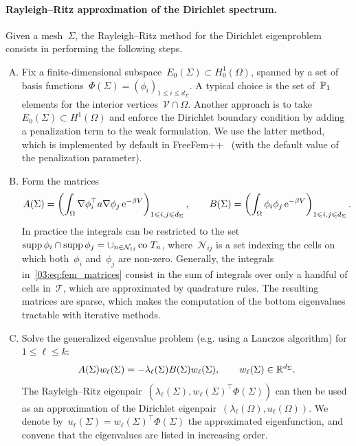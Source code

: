 \paragraph{Rayleigh--Ritz approximation of the Dirichlet spectrum.}
    Given a mesh~$\Sigma$, the Rayleigh--Ritz method for the Dirichlet eigenproblem consists in performing the following steps.
    \label{03:alg:rayleigh_ritz}
    \begin{enumerate}[A.]
        \item{Fix a finite-dimensional subspace~$E_{0}(\Sigma)\subset H_{0}^1(\Omega)$, spanned by a set of basis functions~$\Phi(\Sigma)=\left(\phi_i\right)_{1\leq i\leq d_{\Sigma}}$. A typical choice is the set of~$\P_1$ elements for the interior vertices~$\mathcal V\cap \Omega$.
        Another approach is to take~$E_0(\Sigma) \subset H^1(\Omega)$ and enforce the Dirichlet boundary condition by adding a penalization term to the weak formulation. We use the latter method, which is implemented by default in FreeFem++~\cite{freefem} (with the default value of the penalization parameter).
        }
        \item{Form the matrices
        \begin{equation}
            \label{03:eq:fem_matrices}
            A(\Sigma) = \left(\int_{\Omega} \nabla\phi_i^\top a \nabla\phi_j\,\e^{-\beta V}\right)_{1\leq i,j\leq d_{\Sigma}},\qquad B(\Sigma) = \left(\int_{\Omega} \phi_i\phi_j\,\e^{-\beta V}\right)_{1\leq i,j\leq d_{\Sigma}}.
        \end{equation}
        In practice the integrals can be restricted to the set~$\supp\,\phi_i \cap \supp\,\phi_j = \cup_{n\in \mathcal N_{ij}}\co\, T_n$, where~$\mathcal N_{ij}$ is a set indexing the cells on which both~$\phi_i$ and~$\phi_j$ are non-zero. Generally, the integrals in~\eqref{03:eq:fem_matrices} consist in the sum of integrals over only a handful of cells in~$\mathcal T$, which are approximated by quadrature rules.
        The resulting matrices are sparse, which makes the computation of the bottom eigenvalues tractable with iterative methods.
        }
        \item{Solve the generalized eigenvalue problem (e.g. using a Lanczos algorithm) for~$1\leq\ell\leq k$:
        \begin{equation}
            \label{03:eq:fem_eigenvalues}
            A(\Sigma)w_\ell(\Sigma) = -\lambda_\ell(\Sigma)B(\Sigma)w_\ell(\Sigma),\qquad w_\ell(\Sigma)\in \R^{d_{\Sigma}}.
        \end{equation}
        The Rayleigh--Ritz eigenpair~$\left(\lambda_\ell(\Sigma),w_\ell(\Sigma)^\top \Phi(\Sigma)\right)$ can then be used as an approximation of the Dirichlet eigenpair~$(\lambda_\ell(\Omega),u_\ell(\Omega))$. We denote by~$u_\ell(\Sigma) = w_\ell(\Sigma)^\top \Phi(\Sigma)$ the approximated eigenfunction, and convene that the eigenvalues are listed in increasing order.
        }
    \end{enumerate}

